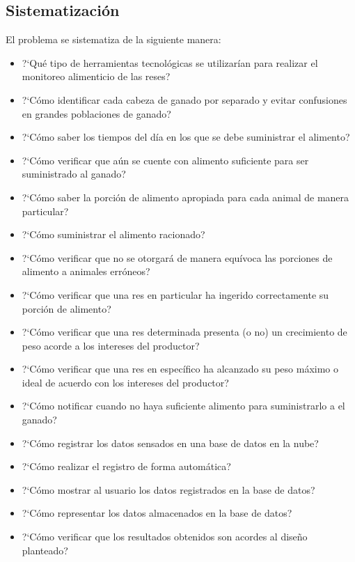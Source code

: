 \subsection{Sistematizaci\'on}
El problema se sistematiza de la siguiente manera:
\begin{itemize}
	\item ?`Qué tipo de herramientas tecnológicas se utilizar\'ian para realizar el monitoreo alimenticio de las reses?
	\item ?`C\'omo identificar cada cabeza de ganado por separado y evitar confusiones en grandes poblaciones de ganado?
	\item ?`C\'omo saber los tiempos del día en los que se debe suministrar el alimento?
	\item ?`C\'omo verificar que aún se cuente con alimento suficiente para ser suministrado al ganado?
	\item ?`C\'omo saber la porción de alimento apropiada para cada animal de manera particular?
	\item ?`C\'omo suministrar el alimento racionado?
	\item ?`C\'omo verificar que no se otorgará de manera equívoca las porciones de alimento a animales erróneos?
	\item ?`C\'omo verificar que una res en particular ha ingerido correctamente su porción de alimento?
	\item ?`C\'omo verificar que una res determinada presenta (o no) un crecimiento de peso acorde a los intereses del productor?
	\item ?`C\'omo verificar que una res en específico ha alcanzado su peso máximo o ideal de acuerdo con los intereses del productor?
	\item ?`C\'omo notificar cuando no haya suficiente alimento para suministrarlo a el ganado?
	\item ?`C\'omo registrar los datos sensados en una base de datos en la nube?
	\item ?`C\'omo realizar el registro de forma automática?
	\item ?`C\'omo mostrar al usuario los datos registrados en la base de datos?
	\item ?`C\'omo representar los datos almacenados en la base de datos?
	\item ?`C\'omo verificar que los resultados obtenidos son acordes al diseño planteado?
\end{itemize}

